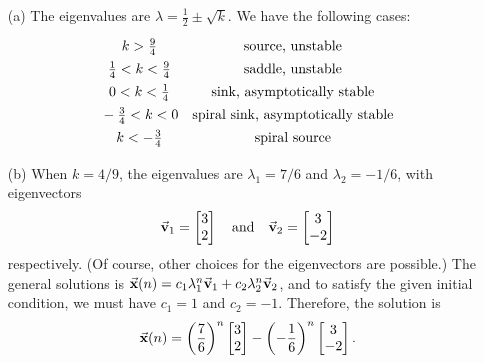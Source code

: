 \begin{enumerate}
\item[(a)]
The eigenvalues are $\lambda = \frac{1}{2} \pm \sqrt{k}$.
We have the following cases:
\[
\begin{matrix}
   \T k > \frac{9}{4} \B& \textrm{source, unstable} \\
   \T \frac{1}{4} < k < \frac{9}{4} \B & \textrm{saddle, unstable} \\
   \T 0 < k < \frac{1}{4} \B& \textrm{sink, asymptotically stable} \\
   \T -\frac{3}{4} < k < 0 \B & \textrm{spiral sink, asymptotically stable} \\
   \T k < -\frac{3}{4} \B & \textrm{spiral source}
\end{matrix}
\]
\item[(b)]
When $k=4/9$, the eigenvalues are $\lambda_1 = 7/6$
and $\lambda_2 = -1/6$, with eigenvectors
\[
  \vec{\textbf{v}}_1 = \begin{bmatrix} 3 \\ 2 \end{bmatrix}
  \quad \textrm{and} \quad
  \vec{\textbf{v}}_2 = \begin{bmatrix} 3 \\ -2 \end{bmatrix}
\]
respectively. (Of course, other choices for the eigenvectors
are possible.)
The general solutions is
$\vec{\textbf{x}}(n) = c_1 \lambda_1^n \vec{\textbf{v}}_1 + c_2 \lambda_2^n \vec{\textbf{v}}_2$,
and to satisfy the given initial condition, we must
have $c_1 = 1$ and $c_2 = -1$.  Therefore, the solution
is
\[
   \vec{\textbf{x}}(n) = \left(\frac{7}{6}\right)^n\begin{bmatrix} 3 \\ 2 \end{bmatrix}
      - \left(-\frac{1}{6}\right)^n\begin{bmatrix} 3 \\ -2 \end{bmatrix}.
\]
\end{enumerate}

